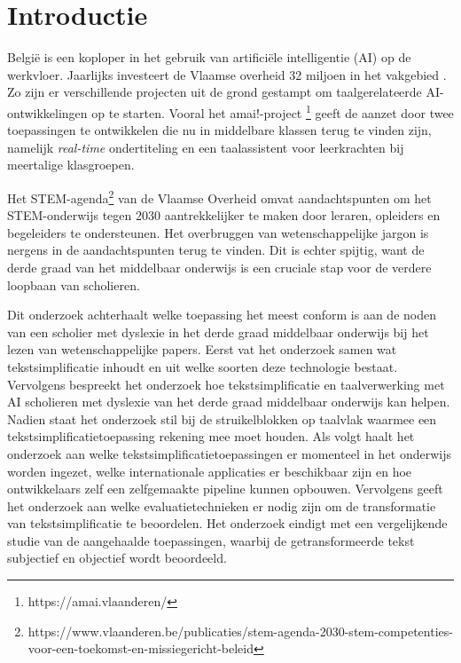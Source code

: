 
\section{Introductie}%
\label{sec:introductie}

België is een koploper in het gebruik van artificiële intelligentie (AI) op de werkvloer. Jaarlijks investeert de Vlaamse overheid 32 miljoen in het vakgebied \autocite{Crevits2022}. Zo zijn er verschillende projecten uit de grond gestampt om taalgerelateerde AI-ontwikkelingen op te starten. Vooral het amai!-project \footnote{https://amai.vlaanderen/} geeft de aanzet door twee toepassingen te ontwikkelen die nu in middelbare klassen terug te vinden zijn, namelijk \textit{real-time} ondertiteling en een taalassistent voor leerkrachten bij meertalige klasgroepen.

Het STEM-agenda\footnote{https://www.vlaanderen.be/publicaties/stem-agenda-2030-stem-competenties-voor-een-toekomst-en-missiegericht-beleid}
van de Vlaamse Overheid omvat aandachtspunten om het STEM-onderwijs tegen 2030 aantrekkelijker te maken door leraren, opleiders en begeleiders te ondersteunen. Het overbruggen van wetenschappelijke jargon is nergens in de aandachtspunten terug te vinden. Dit is echter spijtig, want de derde graad van het middelbaar onderwijs is een cruciale stap voor de verdere loopbaan van scholieren. 

Dit onderzoek achterhaalt welke toepassing het meest conform is aan de noden van een scholier met dyslexie in het derde graad middelbaar onderwijs bij het lezen van wetenschappelijke papers. Eerst vat het onderzoek samen wat tekstsimplificatie inhoudt en uit welke soorten deze technologie bestaat. Vervolgens bespreekt het onderzoek hoe tekstsimplificatie en taalverwerking met AI scholieren met dyslexie van het derde graad middelbaar onderwijs kan helpen. Nadien staat het onderzoek stil bij de struikelblokken op taalvlak waarmee een tekstsimplificatietoepassing rekening mee moet houden. Als volgt haalt het onderzoek aan welke tekstsimplificatietoepassingen er momenteel in het onderwijs worden ingezet, welke internationale applicaties er beschikbaar zijn en hoe ontwikkelaars zelf een zelfgemaakte pipeline kunnen opbouwen. Vervolgens geeft het onderzoek aan welke evaluatietechnieken er nodig zijn om de transformatie van tekstsimplificatie te beoordelen. Het onderzoek eindigt met een vergelijkende studie van de aangehaalde toepassingen, waarbij de getransformeerde tekst subjectief en objectief wordt beoordeeld.

